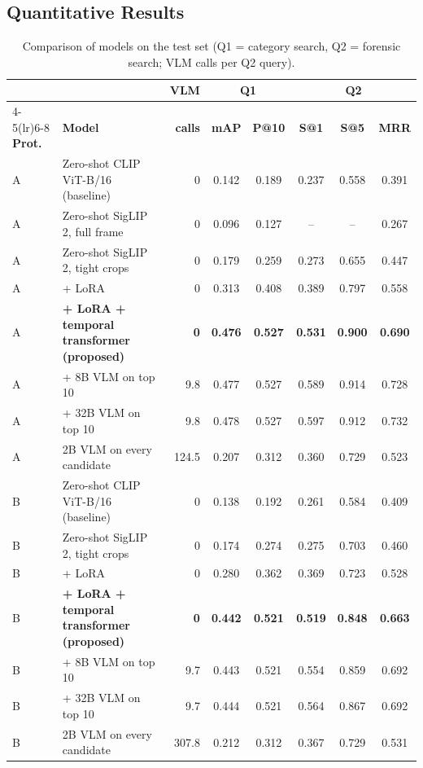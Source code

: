 \documentclass[11pt,a4paper]{article}
\begin{document}
\subsection{Quantitative Results}
\begin{table}[H]
\centering
\caption[Comparison of models on the test set.]{Comparison of models on the test set (Q1 = category search, Q2 = forensic search; VLM calls per Q2 query).}\label{tab:main}
\footnotesize
\setlength{\tabcolsep}{4pt}
\begin{tabular}{llrccccc}
\toprule
& & \textbf{VLM} & \multicolumn{2}{c}{\textbf{Q1}} & \multicolumn{3}{c}{\textbf{Q2}} \\
\cmidrule(lr){4-5}\cmidrule(lr){6-8}
\textbf{Prot.} & \textbf{Model} & \textbf{calls} & \textbf{mAP} & \textbf{P@10} & \textbf{S@1} & \textbf{S@5} & \textbf{MRR} \\
\midrule
A & Zero-shot CLIP ViT-B/16 (baseline) & 0 & 0.142 & 0.189 & 0.237 & 0.558 & 0.391 \\
A & Zero-shot SigLIP 2, full frame & 0 & 0.096 & 0.127 & -- & -- & 0.267 \\
A & Zero-shot SigLIP 2, tight crops & 0 & 0.179 & 0.259 & 0.273 & 0.655 & 0.447 \\
A & + LoRA & 0 & 0.313 & 0.408 & 0.389 & 0.797 & 0.558 \\
A & \textbf{+ LoRA + temporal transformer (proposed)} & \textbf{0} & \textbf{0.476} & \textbf{0.527} & \textbf{0.531} & \textbf{0.900} & \textbf{0.690} \\
A & \quad + 8B VLM on top 10 & 9.8 & 0.477 & 0.527 & 0.589 & 0.914 & 0.728 \\
A & \quad + 32B VLM on top 10 & 9.8 & 0.478 & 0.527 & 0.597 & 0.912 & 0.732 \\
A & 2B VLM on every candidate & 124.5 & 0.207 & 0.312 & 0.360 & 0.729 & 0.523 \\
\midrule
B & Zero-shot CLIP ViT-B/16 (baseline) & 0 & 0.138 & 0.192 & 0.261 & 0.584 & 0.409 \\
B & Zero-shot SigLIP 2, tight crops & 0 & 0.174 & 0.274 & 0.275 & 0.703 & 0.460 \\
B & + LoRA & 0 & 0.280 & 0.362 & 0.369 & 0.723 & 0.528 \\
B & \textbf{+ LoRA + temporal transformer (proposed)} & \textbf{0} & \textbf{0.442} & \textbf{0.521} & \textbf{0.519} & \textbf{0.848} & \textbf{0.663} \\
B & \quad + 8B VLM on top 10 & 9.7 & 0.443 & 0.521 & 0.554 & 0.859 & 0.692 \\
B & \quad + 32B VLM on top 10 & 9.7 & 0.444 & 0.521 & 0.564 & 0.867 & 0.692 \\
B & 2B VLM on every candidate & 307.8 & 0.212 & 0.312 & 0.367 & 0.729 & 0.531 \\
\bottomrule
\end{tabular}
\end{table}
\end{document}
